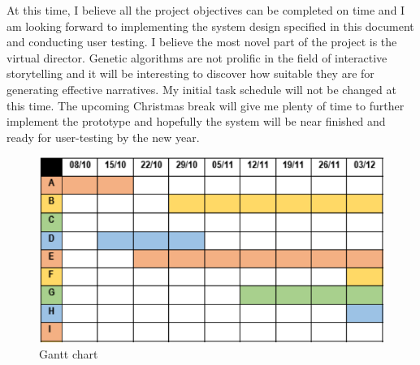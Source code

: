 \documentclass{sig-alternate-05-2015}
\begin{document}
\newline At this time, I believe all the project objectives can be completed on time and I am looking forward to implementing the system design specified in this document and conducting user testing. I believe the most novel part of the project is the virtual director. Genetic algorithms are not prolific in the field of interactive storytelling and it will be interesting to discover how suitable they are for generating effective narratives. My initial task schedule will not be changed at this time. The upcoming Christmas break will give me plenty of time to further implement the prototype and hopefully the system will be near finished and ready for user-testing by the new year.

\begin{figure}
\centering
\includegraphics[scale=0.33]{Images/gantt.png}
\caption{Gantt chart}
\label{fig:Gantt}
\end{figure}
\end{document}
